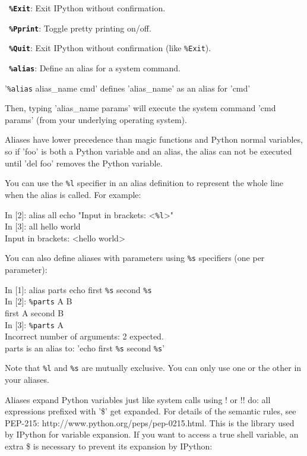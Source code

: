 
\bigskip
\texttt{\textbf{ \%Exit}}:
	Exit IPython without confirmation.

\bigskip
\texttt{\textbf{ \%Pprint}}:
	Toggle pretty printing on/off.

\bigskip
\texttt{\textbf{ \%Quit}}:
	Exit IPython without confirmation (like \texttt{\%Exit}).

\bigskip
\texttt{\textbf{ \%alias}}:
	Define an alias for a system command.

        '\texttt{\%alias} alias\_name cmd' defines 'alias\_name' as an alias for 'cmd'

        Then, typing 'alias\_name params' will execute the system command 'cmd
        params' (from your underlying operating system).

        Aliases have lower precedence than magic functions and Python normal
        variables, so if 'foo' is both a Python variable and an alias, the
        alias can not be executed until 'del foo' removes the Python variable.

        You can use the \texttt{\%l} specifier in an alias definition to represent the
        whole line when the alias is called.  For example:

          In [2]: alias all echo "Input in brackets: <\texttt{\%l}>"\\
          In [3]: all hello world\\
          Input in brackets: <hello world>

        You can also define aliases with parameters using \texttt{\%s} specifiers (one
        per parameter):
        
          In [1]: alias parts echo first \texttt{\%s} second \texttt{\%s}\\
          In [2]: \texttt{\%parts} A B\\
          first A second B\\
          In [3]: \texttt{\%parts} A\\
          Incorrect number of arguments: 2 expected.\\
          parts is an alias to: 'echo first \texttt{\%s} second \texttt{\%s}'

        Note that \texttt{\%l} and \texttt{\%s} are mutually exclusive.  You can only use one or
        the other in your aliases.

        Aliases expand Python variables just like system calls using ! or !! 
        do: all expressions prefixed with '\$' get expanded.  For details of
        the semantic rules, see PEP-215:
        http://www.python.org/peps/pep-0215.html.  This is the library used by
        IPython for variable expansion.  If you want to access a true shell
        variable, an extra \$ is necessary to prevent its expansion by IPython:


